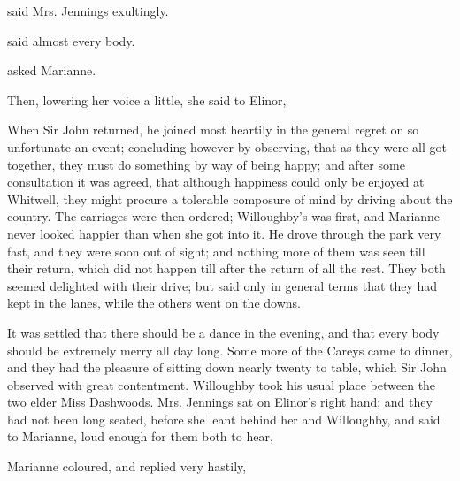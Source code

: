  said Mrs. Jennings exultingly.

 said almost every body.


 asked Marianne.

 Then, lowering her voice a little, she said to Elinor, 



When Sir John returned, he joined most heartily in the general regret on so unfortunate an event; concluding however by observing, that as they were all got together, they must do something by way of being happy; and after some consultation it was agreed, that although happiness could only be enjoyed at Whitwell, they might procure a tolerable composure of mind by driving about the country. The carriages were then ordered; Willoughby's was first, and Marianne never looked happier than when she got into it. He drove through the park very fast, and they were soon out of sight; and nothing more of them was seen till their return, which did not happen till after the return of all the rest. They both seemed delighted with their drive; but said only in general terms that they had kept in the lanes, while the others went on the downs.

It was settled that there should be a dance in the evening, and that every body should be extremely merry all day long. Some more of the Careys came to dinner, and they had the pleasure of sitting down nearly twenty to table, which Sir John observed with great contentment. Willoughby took his usual place between the two elder Miss Dashwoods. Mrs. Jennings sat on Elinor's right hand; and they had not been long seated, before she leant behind her and Willoughby, and said to Marianne, loud enough for them both to hear, 

Marianne coloured, and replied very hastily, 


